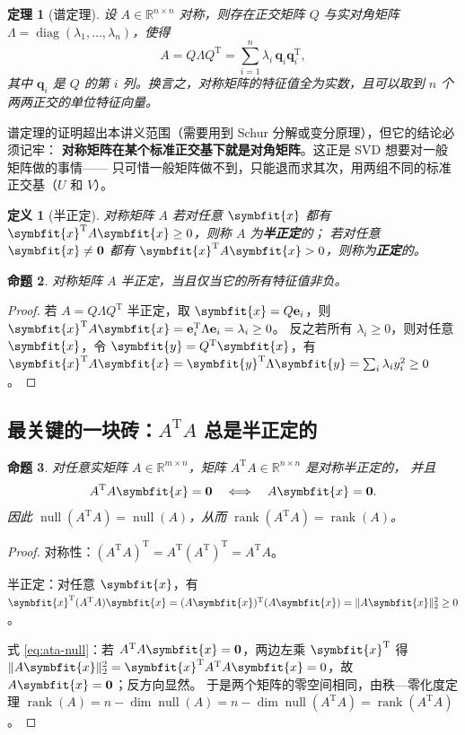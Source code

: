 \documentclass[UTF8, 11pt, a4paper, fontset=windows]{ctexart}
\theoremstyle{cnthm}
\newtheorem{thm}{定理}[section]
\newtheorem{prop}[thm]{命题}
\theoremstyle{cndef}
\newtheorem{defn}{定义}[section]
\newcommand{\T}{^{\mathrm{T}}}
\newcommand{\R}{\mathbb{R}}
\newcommand{\nrm}[1]{\lVert #1 \rVert}
\DeclareMathOperator{\rank}{rank}
\DeclareMathOperator{\diag}{diag}
\DeclareMathOperator{\Null}{null}
\newcommand{\x}{\symbfit{x}}
\newcommand{\y}{\symbfit{y}}
\begin{document}
\begin{thm}[谱定理]\label{thm:spectral}
设 $A\in\R^{n\times n}$ 对称，则存在正交矩阵 $Q$ 与实对角矩阵
$\Lambda=\diag(\lambda_1,\dots,\lambda_n)$，使得
\begin{equation}
  A=Q\Lambda Q\T=\sum_{i=1}^{n}\lambda_i\,\mathbf{q}_i\mathbf{q}_i\T ,
\end{equation}
其中 $\mathbf{q}_i$ 是 $Q$ 的第 $i$ 列。换言之，对称矩阵的特征值全为实数，且可以取到
$n$ 个两两正交的单位特征向量。
\end{thm}

谱定理的证明超出本讲义范围（需要用到 Schur 分解或变分原理），但它的结论必须记牢：
\textbf{对称矩阵在某个标准正交基下就是对角矩阵}。这正是 SVD 想要对一般矩阵做的事情——
只可惜一般矩阵做不到，只能退而求其次，用两组不同的标准正交基（$U$ 和 $V$）。

\begin{defn}[半正定]
对称矩阵 $A$ 若对任意 $\x$ 都有 $\x\T A\x\ge0$，则称 $A$ 为\textbf{半正定}的；
若对任意 $\x\neq\mathbf{0}$ 都有 $\x\T A\x>0$，则称为\textbf{正定}的。
\end{defn}

\begin{prop}\label{prop:psd-eig}
对称矩阵 $A$ 半正定，当且仅当它的所有特征值非负。
\end{prop}

\begin{proof}
若 $A=Q\Lambda Q\T$ 半正定，取 $\x=Q\mathbf{e}_i$，则
$\x\T A\x=\mathbf{e}_i\T\Lambda\mathbf{e}_i=\lambda_i\ge0$。
反之若所有 $\lambda_i\ge0$，则对任意 $\x$，令 $\y=Q\T\x$，有
$\x\T A\x=\y\T\Lambda\y=\sum_i\lambda_i y_i^2\ge0$。
\end{proof}

\subsection{最关键的一块砖：\texorpdfstring{$A\T A$}{ATA} 总是半正定的}

\begin{prop}\label{prop:ata-psd}
对任意实矩阵 $A\in\R^{m\times n}$，矩阵 $A\T A\in\R^{n\times n}$ 是对称半正定的，
并且
\begin{equation}\label{eq:ata-null}
  A\T A\x=\mathbf{0}\quad\Longleftrightarrow\quad A\x=\mathbf{0}.
\end{equation}
因此 $\Null(A\T A)=\Null(A)$，从而 $\rank(A\T A)=\rank(A)$。
\end{prop}

\begin{proof}
对称性：$(A\T A)\T=A\T(A\T)\T=A\T A$。

半正定：对任意 $\x$，有 $\x\T(A\T A)\x=(A\x)\T(A\x)=\nrm{A\x}_2^2\ge0$。

式 \eqref{eq:ata-null}：若 $A\T A\x=\mathbf{0}$，两边左乘 $\x\T$ 得
$\nrm{A\x}_2^2=\x\T A\T A\x=0$，故 $A\x=\mathbf{0}$；反方向显然。
于是两个矩阵的零空间相同，由秩—零化度定理
$\rank(A)=n-\dim\Null(A)=n-\dim\Null(A\T A)=\rank(A\T A)$。
\end{proof}
\end{document}
